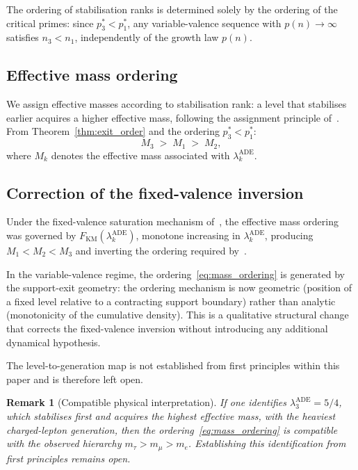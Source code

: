 \documentclass[11pt]{article}
\newtheorem{remark}[theorem]{Remark}
\newcommand{\lADE}[1]{\lambda_{#1}^{\mathrm{ADE}}}
\newcommand{\FKM}{F_{\mathrm{KM}}}
\begin{document}
    The ordering of stabilisation ranks is determined solely by the ordering of
    the critical primes: since $p_3^* < p_1^*$, any variable-valence sequence
    with $p(n) \to \infty$ satisfies $n_3 < n_1$, independently of the growth
    law $p(n)$.

  \subsection{Effective mass ordering}
    \label{subsec:mass_from_exit}

    We assign effective masses according to stabilisation rank: a level that
    stabilises earlier acquires a higher effective mass, following the assignment
    principle of~\cite{Beau2026a4,Beau2026a5}.
    From Theorem~\ref{thm:exit_order} and the ordering $p_3^* < p_1^*$:
    \begin{equation}
      M_3 \;>\; M_1 \;>\; M_2,
      \label{eq:mass_ordering}
    \end{equation}
    where $M_k$ denotes the effective mass associated with $\lADE{k}$.

  \subsection{Correction of the fixed-valence inversion}
    \label{subsec:inversion_correction}

    Under the fixed-valence saturation mechanism of~\cite{Beau2026a5}, the
    effective mass ordering was governed by $\FKM(\lADE{k})$, monotone increasing
    in $\lADE{k}$, producing $M_1 < M_2 < M_3$ and inverting the ordering
    required by~\cite{Beau2026a4}.

    In the variable-valence regime, the ordering~\eqref{eq:mass_ordering} is
    generated by the support-exit geometry: the ordering mechanism is now geometric
    (position of a fixed level relative to a contracting support boundary) rather
    than analytic (monotonicity of the cumulative density).
    This is a qualitative structural change that corrects the fixed-valence
    inversion without introducing any additional dynamical hypothesis.

    The level-to-generation map is not established from first principles within
    this paper and is therefore left open.

    \begin{remark}[Compatible physical interpretation]
  If one identifies $\lADE{3} = 5/4$, which stabilises first and acquires the
  highest effective mass, with the heaviest charged-lepton generation, then
  the ordering~\eqref{eq:mass_ordering} is compatible with the observed
  hierarchy $m_\tau > m_\mu > m_e$.
  Establishing this identification from first principles remains open.
    \end{remark}
\end{document}
